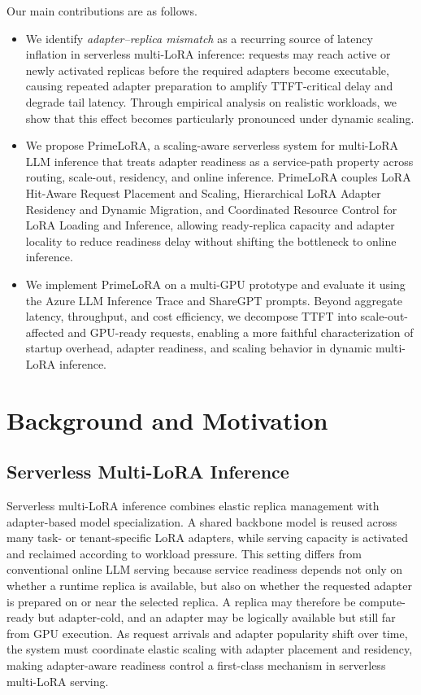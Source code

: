 \documentclass[lettersize,journal]{IEEEtran}
\begin{document}
Our main contributions are as follows.
\begin{itemize}
\item We identify \emph{adapter--replica mismatch} as a recurring source of latency inflation in serverless multi-LoRA inference: requests may reach active or newly activated replicas before the required adapters become executable, causing repeated adapter preparation to amplify TTFT-critical delay and degrade tail latency. Through empirical analysis on realistic workloads, we show that this effect becomes particularly pronounced under dynamic scaling.
\item We propose PrimeLoRA, a scaling-aware serverless system for multi-LoRA LLM inference that treats adapter readiness as a service-path property across routing, scale-out, residency, and online inference. PrimeLoRA couples LoRA Hit-Aware Request Placement and Scaling, Hierarchical LoRA Adapter Residency and Dynamic Migration, and Coordinated Resource Control for LoRA Loading and Inference, allowing ready-replica capacity and adapter locality to reduce readiness delay without shifting the bottleneck to online inference.
\item We implement PrimeLoRA on a multi-GPU prototype and evaluate it using the Azure LLM Inference Trace and ShareGPT prompts. Beyond aggregate latency, throughput, and cost efficiency, we decompose TTFT into scale-out-affected and GPU-ready requests, enabling a more faithful characterization of startup overhead, adapter readiness, and scaling behavior in dynamic multi-LoRA inference.
\end{itemize}

\section{Background and Motivation}
\label{sec:background}

\subsection{Serverless Multi-LoRA Inference}

Serverless multi-LoRA inference combines elastic replica management with adapter-based model specialization. A shared backbone model is reused across many task- or tenant-specific LoRA adapters, while serving capacity is activated and reclaimed according to workload pressure. This setting differs from conventional online LLM serving because service readiness depends not only on whether a runtime replica is available, but also on whether the requested adapter is prepared on or near the selected replica. A replica may therefore be compute-ready but adapter-cold, and an adapter may be logically available but still far from GPU execution. As request arrivals and adapter popularity shift over time, the system must coordinate elastic scaling with adapter placement and residency, making adapter-aware readiness control a first-class mechanism in serverless multi-LoRA serving.
\end{document}
